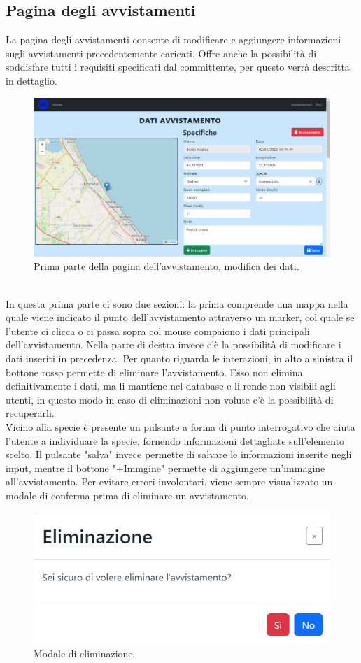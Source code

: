 \documentclass[a4paper,final,12pt]{report}
\begin{document}
\subsection{Pagina degli avvistamenti}
La pagina degli avvistamenti consente di modificare e aggiungere informazioni sugli avvistamenti precedentemente caricati. Offre anche la possibilità di soddisfare tutti i requisiti specificati dal committente, per questo verrà descritta in dettaglio.
\begin{figure}[hbtp]
\centering
\includegraphics[scale=0.35]{img_concettuale/avvistamentoPAG.png}
\caption{Prima parte della pagina dell'avvistamento, modifica dei dati.}
\end{figure}
\\In questa prima parte ci sono due sezioni: la prima comprende una mappa nella quale viene indicato il punto dell'avvistamento attraverso un marker, col quale se l'utente ci clicca o ci passa sopra col mouse compaiono i dati principali dell'avvistamento. Nella parte di destra invece c'è la possibilità di modificare i dati inseriti in precedenza.
Per quanto riguarda le interazioni, in alto a sinistra il bottone rosso permette di eliminare l'avvistamento. Esso non elimina definitivamente i dati, ma li mantiene nel database e li rende non visibili agli utenti, in questo modo in caso di eliminazioni non volute c'è la possibilità di recuperarli.\\
Vicino alla specie è presente un pulsante a forma di punto interrogativo che aiuta l'utente a individuare la specie, fornendo informazioni dettagliate sull'elemento scelto.  
Il pulsante "salva" invece permette di salvare le informazioni inserite negli input, mentre il bottone "+Immgine" permette di aggiungere un'immagine all'avvistamento. Per evitare errori involontari, viene sempre visualizzato un modale di conferma prima di eliminare un avvistamento.
\begin{figure}[hbtp]
\centering
\includegraphics[scale=0.50]{img_concettuale/eliminazione.png}
\caption{Modale di eliminazione.}
\end{figure}
\end{document}
